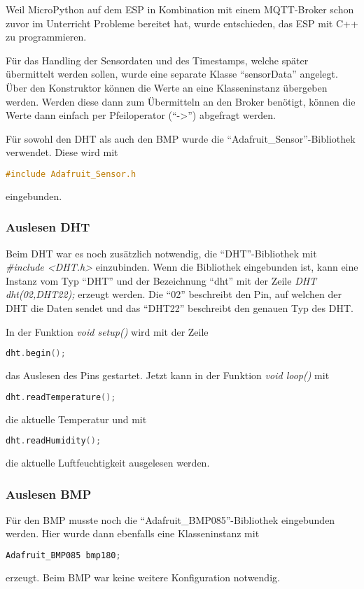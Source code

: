 Weil MicroPython auf dem ESP in Kombination mit einem MQTT-Broker schon 
zuvor im Unterricht Probleme bereitet hat, wurde entschieden, das ESP mit C++ zu programmieren.

Für das Handling der Sensordaten und des Timestamps, welche später übermittelt werden sollen, wurde eine separate Klasse "`sensorData"' angelegt.
Über den Konstruktor können die Werte an eine Klasseninstanz übergeben werden. 
Werden diese dann zum Übermitteln an den Broker benötigt, können die Werte dann einfach per Pfeiloperator ("`->"') abgefragt werden.

Für sowohl den DHT als auch den BMP wurde die "`Adafruit\_Sensor"'-Bibliothek verwendet.
Diese wird mit 
\begin{lstlisting}[language=C++]
	#include Adafruit_Sensor.h
\end{lstlisting}
eingebunden.

\subsubsection{Auslesen DHT}
	Beim DHT war es noch zusätzlich notwendig, die "`DHT"'-Bibliothek mit \textit{\#include <DHT.h>} einzubinden.
	Wenn die Bibliothek eingebunden ist, kann eine Instanz vom Typ "`DHT"' und der Bezeichnung "`dht"' mit der Zeile \textit{DHT dht(02,DHT22);} erzeugt werden.
	Die "`02"' beschreibt den Pin, auf welchen der DHT die Daten sendet und das "`DHT22"' beschreibt den genauen Typ des DHT.
	
	In der Funktion \textit{void setup()} wird mit der Zeile
\begin{lstlisting}[language=C++]
	dht.begin();
\end{lstlisting}
	das Auslesen des Pins gestartet. 
	Jetzt kann in der Funktion \textit{void loop()} mit 
\begin{lstlisting}[language=C++]
	dht.readTemperature();
\end{lstlisting}
	die aktuelle Temperatur und mit
\begin{lstlisting}[language=C++]
	dht.readHumidity();
\end{lstlisting}
	die aktuelle Luftfeuchtigkeit ausgelesen werden.
	
\subsubsection{Auslesen BMP}
	Für den BMP musste noch die "`Adafruit\_BMP085"'-Bibliothek eingebunden werden.
	Hier wurde dann ebenfalls eine Klasseninstanz mit 
\begin{lstlisting}[language=C++]
	Adafruit_BMP085 bmp180;
\end{lstlisting}
	erzeugt. Beim BMP war keine weitere Konfiguration notwendig.
	
